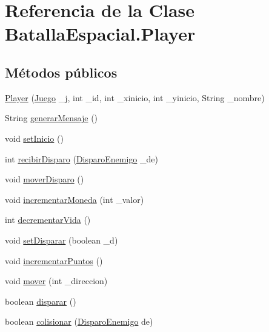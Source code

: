 \hypertarget{classBatallaEspacial_1_1Player}{
\section{Referencia de la Clase BatallaEspacial.Player}
\label{classBatallaEspacial_1_1Player}
}
\subsection*{Métodos públicos}
\begin{DoxyCompactItemize}
\item 
\hyperlink{classBatallaEspacial_1_1Player_a02b30d9d53f09e85d6ff481cde85b980}{Player} (\hyperlink{classBatallaEspacial_1_1Juego}{Juego} \_\-j, int \_\-id, int \_\-xinicio, int \_\-yinicio, String \_\-nombre)
\item 
String \hyperlink{classBatallaEspacial_1_1Player_aa9adf40570d1ced60965ba32398ce1bb}{generarMensaje} ()
\item 
void \hyperlink{classBatallaEspacial_1_1Player_a9591bd93b0dbce55e6aa444150b46a1d}{setInicio} ()
\item 
int \hyperlink{classBatallaEspacial_1_1Player_aee74d2ba3a569e9667d5e0396f9f5478}{recibirDisparo} (\hyperlink{classBatallaEspacial_1_1DisparoEnemigo}{DisparoEnemigo} \_\-de)
\item 
void \hyperlink{classBatallaEspacial_1_1Player_ab19130e949cc7025184c788d7ee144cb}{moverDisparo} ()
\item 
void \hyperlink{classBatallaEspacial_1_1Player_a7faea863a5e7870fe17dea9ace5e63e5}{incrementarMoneda} (int \_\-valor)
\item 
int \hyperlink{classBatallaEspacial_1_1Player_ab8b0469d9c6b6c9d4d73e57d832f188f}{decrementarVida} ()
\item 
void \hyperlink{classBatallaEspacial_1_1Player_ac8f285c2930d6829e6a7b1504a02334d}{setDisparar} (boolean \_\-d)
\item 
void \hyperlink{classBatallaEspacial_1_1Player_a24a754f0d64ec08f6a46cf251489e7b1}{incrementarPuntos} ()
\item 
void \hyperlink{classBatallaEspacial_1_1Player_ad6bf1fe70a5e9b7d34b4fd0d53f1cc5f}{mover} (int \_\-direccion)
\item 
boolean \hyperlink{classBatallaEspacial_1_1Player_afa4c502ba9ce6f7dbf2fd4dfa3a8c900}{disparar} ()
\item 
boolean \hyperlink{classBatallaEspacial_1_1Player_aab96d078b1a578175cb4b31f3c4a6ab3}{colisionar} (\hyperlink{classBatallaEspacial_1_1DisparoEnemigo}{DisparoEnemigo} de)

\end{DoxyCompactItemize}
